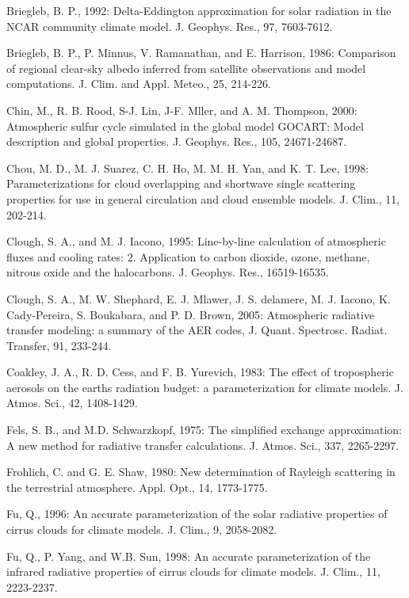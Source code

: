 Briegleb, B. P., 1992\+: Delta-\/\+Eddington approximation for solar radiation in the N\+C\+AR community climate model. J. Geophys. Res., 97, 7603-\/7612.

Briegleb, B. P., P. Minnus, V. Ramanathan, and E. Harrison, 1986\+: Comparison of regional clear-\/sky albedo inferred from satellite observations and model computations. J. Clim. and Appl. Meteo., 25, 214-\/226.

Chin, M., R. B. Rood, S-\/J. Lin, J-\/F. Mller, and A. M. Thompson, 2000\+: Atmospheric sulfur cycle simulated in the global model G\+O\+C\+A\+RT\+: Model description and global properties. J. Geophys. Res., 105, 24671-\/24687.

Chou, M. D., M. J. Suarez, C. H. Ho, M. M. H. Yan, and K. T. Lee, 1998\+: Parameterizations for cloud overlapping and shortwave single scattering properties for use in general circulation and cloud ensemble models. J. Clim., 11, 202-\/214.

Clough, S. A., and M. J. Iacono, 1995\+: Line-\/by-\/line calculation of atmospheric fluxes and cooling rates\+: 2. Application to carbon dioxide, ozone, methane, nitrous oxide and the halocarbons. J. Geophys. Res., 16519-\/16535.

Clough, S. A., M. W. Shephard, E. J. Mlawer, J. S. delamere, M. J. Iacono, K. Cady-\/\+Pereira, S. Boukabara, and P. D. Brown, 2005\+: Atmospheric radiative transfer modeling\+: a summary of the A\+ER codes, J. Quant. Spectrosc. Radiat. Transfer, 91, 233-\/244.

Coakley, J. A., R. D. Cess, and F. B. Yurevich, 1983\+: The effect of tropospheric aerosols on the earth\textquotesingle{}s radiation budget\+: a parameterization for climate models. J. Atmos. Sci., 42, 1408-\/1429.

Fels, S. B., and M.\+D. Schwarzkopf, 1975\+: The simplified exchange approximation\+: A new method for radiative transfer calculations. J. Atmos. Sci., 337, 2265-\/2297.

Frohlich, C. and G. E. Shaw, 1980\+: New determination of Rayleigh scattering in the terrestrial atmosphere. Appl. Opt., 14, 1773-\/1775.

Fu, Q., 1996\+: An accurate parameterization of the solar radiative properties of cirrus clouds for climate models. J. Clim., 9, 2058-\/2082.

Fu, Q., P. Yang, and W.\+B. Sun, 1998\+: An accurate parameterization of the infrared radiative properties of cirrus clouds for climate models. J. Clim., 11, 2223-\/2237.

